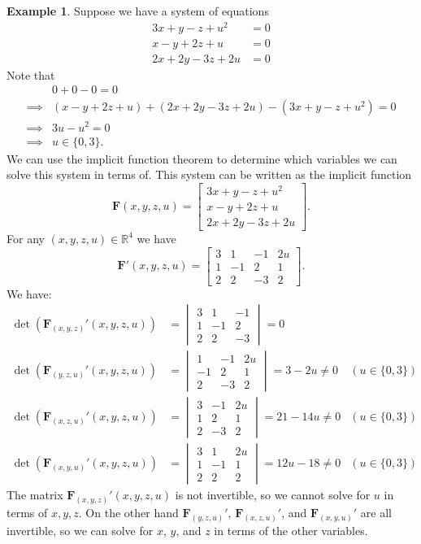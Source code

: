 \documentclass{article}
\newcommand{\R}{\mathbb{R}}
\newcommand{\x}{\mathbf{x}}
\newcommand{\F}{\mathbf{F}}
\theoremstyle{definition}
\newtheorem{example}{Example}[section]
\begin{document}
	\begin{example}
		Suppose we have a system of equations 
		\begin{align*}
			3x+y-z+u^2&=0\\x-y+2z+u&=0\\2x+2y-3z+2u&=0
		\end{align*}
		Note that 
		\begin{align*}
			&0+0-0 = 0\\\implies & (x-y+2z+u) + (2x+2y-3z+2u)-(	3x+y-z+u^2)=0\\
			\implies & 3u-u^2= 0\\
			\implies &u\in\{0,3\}.
		\end{align*}
		We can use the implicit function theorem to determine which variables we can solve this system in terms of. This system can be written as the implicit function 
		$$ \mathbf F(x,y,z,u)=\begin{bmatrix}
			3x+y-z+u^2\\
			x-y+2z+u\\
			2x+2y-3z+2u
		\end{bmatrix}.$$
		For any $ (x,y,z,u)\in\R^4 $ we have 
		$$ \F'(x,y,z,u)=\begin{bmatrix}
			3&1&-1&2u\\1&-1&2&1\\2&2&-3&2
		\end{bmatrix}.$$
		We have:
		\begin{align*}
			\det \left(\F_{(x,y,z)}'(x,y,z,u)\right) &= \begin{vmatrix}
				3 & 1 & -1 \\
				1 & -1 & 2 \\
				2 & 2 & -3
			\end{vmatrix} = 0\\
			\det \left(\F_{(y,z,u)}'(x,y,z,u)\right) &= \begin{vmatrix}
				1 & -1 & 2u \\
				-1 & 2 & 1 \\
				2 & -3 & 2
			\end{vmatrix} = 3-2u\neq 0 &\left(u\in\{0,3\}\right) \\
			\det \left(\F_{(x,z,u)}'(x,y,z,u)\right) &= \begin{vmatrix}
				3 & -1 & 2u \\
				1 & 2 & 1 \\
				2 & -3 & 2
			\end{vmatrix} = 21- 14u \neq 0&\left(u\in\{0,3\}\right) \\
			\det \left(\F_{(x,y,u)}'(x,y,z,u)\right) &= \begin{vmatrix}
				3 & 1 & 2u \\
				1 & -1 & 1 \\
				2 & 2 & 2
			\end{vmatrix} = 12u- 18 \neq 0&\left(u\in\{0,3\}\right) 
		\end{align*}
		The matrix $ \F_{(x,y,z)}'(x,y,z,u)$ is not invertible, so we cannot solve for $ u $ in terms of $ x,y,z $. On the other hand $ \F_{(y,z,u)}' $, $  \F_{(x,z,u)}'$, and $ \F_{(x,y,u)}' $ are all invertible, so we can solve for $ x $, $ y $, and $ z $ in terms of the other variables. 
	\end{example}
\end{document}

